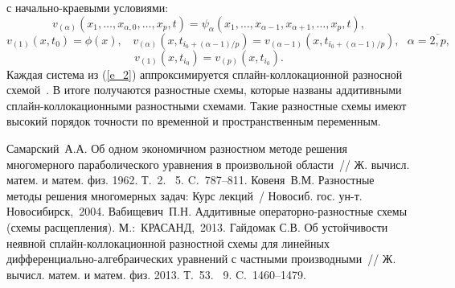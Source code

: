 с начально-краевыми условиями: 
$$
v_{(\alpha)}(x_{1},\dots,x_{\alpha, 0},\dots,x_{p},t)=\psi_{\alpha}(x_{1},\dots,x_{\alpha-1},x_{\alpha+1},\dots,x_{p},t),
$$
$$
v_{(1)}(x,t_{0})=\phi(x),\ \ \ \ v_{(\alpha)}(x,t_{i_{0}+(\alpha-1)/p})=v_{(\alpha-1)}(x,t_{i_{0}+(\alpha-1)/p}),\ \ \ \alpha=\overline{2,p},
$$
$$
v_{(1)}(x,t_{i_{0}})=v_{(p)}(x,t_{i_{0}}).
$$
Каждая система из (\ref{e_2}) аппроксимируется сплайн-коллокационной разносной схемой~\cite{Sv}. В итоге получаются разностные схемы, которые названы аддитивными сплайн-кол\-ло\-ка\-ци\-он\-ными разностными схемами. Такие разностные схемы имеют высокий порядок точности по временной и пространственным переменным. 

\begin{thebibliography}{9} 
 Самарский~А.А. Об одном экономичном разностном методе решения многомерного параболического уравнения в произвольной области~// Ж. вычисл. матем. и матем. физ. 1962. Т.~2. \textnumero~5. C.~787--811.
 Ковеня~В.М. Разностные методы решения многомерных задач: Курс лекций~/ Новосиб. гос. ун-т. Новосибирск,~2004.
 Вабищевич~П.Н. Аддитивные операторно-разностные схемы (схемы расщепления). М.:~КРАСАНД,~2013.
  Гайдомак С.В. Об устойчивости неявной сплайн-коллокационной разностной схемы для линейных дифференциально-алгебраических уравнений с частными производными~// Ж. вычисл. матем. и матем. физ. 2013.  Т.~53. \textnumero~9. C.~1460--1479.   
\end{thebibliography}





%

